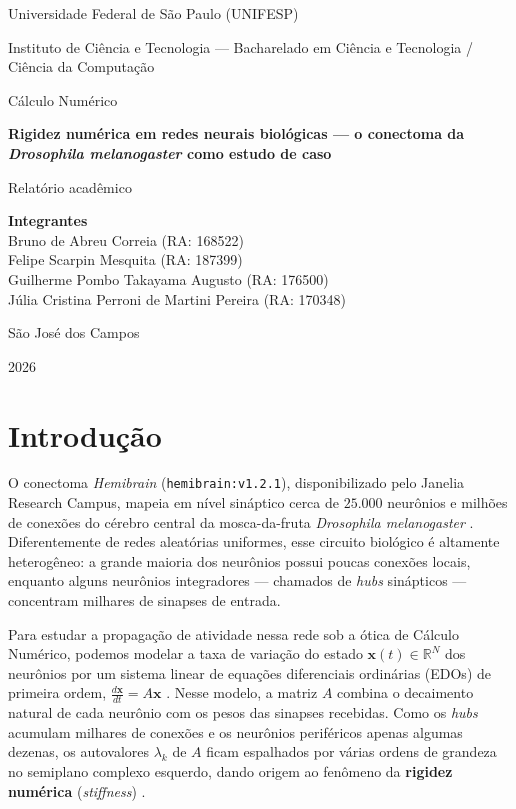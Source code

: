 \documentclass[12pt,a4paper]{article}
\newcommand{\TituloRelatorio}{Rigidez numérica em redes neurais biológicas --- o conectoma da \textit{Drosophila melanogaster} como estudo de caso}
\newcommand{\Disciplina}{Cálculo Numérico}
\newcommand{\Universidade}{Universidade Federal de São Paulo (UNIFESP)}
\newcommand{\Curso}{Instituto de Ciência e Tecnologia --- Bacharelado em Ciência e Tecnologia / Ciência da Computação}
\newcommand{\Ano}{2026}
\begin{document}
\begin{titlepage}
    \centering
    {\large \Universidade\par}
    \vspace{0.5cm}
    {\large \Curso\par}
    \vspace{1cm}
    {\large \Disciplina\par}
    \vspace{2.2cm}
    {\LARGE\bfseries \TituloRelatorio\par}
    \vspace{1.5cm}
    {\large Relatório acadêmico\par}
    \vfill
    \begin{minipage}{0.85\textwidth}
        \centering
        \textbf{Integrantes}\\[0.4cm]
        Bruno de Abreu Correia (RA: 168522)\\
        Felipe Scarpin Mesquita (RA: 187399)\\
        Guilherme Pombo Takayama Augusto (RA: 176500)\\
        Júlia Cristina Perroni de Martini Pereira (RA: 170348)
    \end{minipage}
    \vfill
    {\large São José dos Campos\par}
    {\large \Ano\par}
\end{titlepage}

\tableofcontents
\newpage

\section{Introdução}

O conectoma \textit{Hemibrain} (\texttt{hemibrain:v1.2.1}), disponibilizado pelo Janelia Research Campus, mapeia em nível sináptico cerca de $25.000$ neurônios e milhões de conexões do cérebro central da mosca-da-fruta \textit{Drosophila melanogaster} \cite{scheffer2020}. Diferentemente de redes aleatórias uniformes, esse circuito biológico é altamente heterogêneo: a grande maioria dos neurônios possui poucas conexões locais, enquanto alguns neurônios integradores --- chamados de \textit{hubs} sinápticos --- concentram milhares de sinapses de entrada.

Para estudar a propagação de atividade nessa rede sob a ótica de Cálculo Numérico, podemos modelar a taxa de variação do estado $\mathbf{x}(t) \in \mathbb{R}^N$ dos neurônios por um sistema linear de equações diferenciais ordinárias (EDOs) de primeira ordem, $\frac{d\mathbf{x}}{dt} = A\mathbf{x}$ \cite{strang1997}. Nesse modelo, a matriz $A$ combina o decaimento natural de cada neurônio com os pesos das sinapses recebidas. Como os \textit{hubs} acumulam milhares de conexões e os neurônios periféricos apenas algumas dezenas, os autovalores $\lambda_k$ de $A$ ficam espalhados por várias ordens de grandeza no semiplano complexo esquerdo, dando origem ao fenômeno da \textbf{rigidez numérica} (\textit{stiffness}) \cite{burden2016,hairer1996}.
\end{document}

